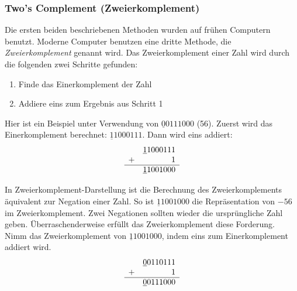 \subsubsection{Two's Complement (Zweierkomplement)
  }

Die ersten beiden beschriebenen Methoden wurden auf fr\"{u}hen Computern
benutzt. Moderne Computer benutzen eine dritte Methode, die
\emph{Zweierkomplement} genannt wird. Das Zweierkomplement einer
Zahl wird durch die folgenden zwei Schritte gefunden:
\begin{enumerate}
\parskip=-0.25em %

\item Finde das Einerkomplement der Zahl

\item Addiere eins zum Ergebnis aus Schritt 1
\end{enumerate}
Hier ist ein Beispiel unter Verwendung von $\underline{0}0111000$
(56). Zuerst wird das Einerkomplement berechnet:
$\underline{1}1000111$. Dann wird eins addiert:
\[
\begin{array}{rr}
  & \underline{1}1000111 \\
 +&                    1 \\
 \hline
  & \underline{1}1001000
\end{array}
\]

In Zweierkomplement-Darstellung ist die Berechnung des
Zweierkomplements \"{a}quivalent zur Negation einer Zahl. So ist
$\underline{1}1001000$ die Repr\"{a}sentation von $-56$ im
Zweierkomplement. Zwei Negationen sollten wieder die urspr\"{u}ngliche
Zahl geben. \"{U}berraschenderweise erf\"{u}llt das Zweierkomplement diese
Forderung. Nimm das Zweierkomplement von $\underline{1}1001000$,
indem eins zum Einerkomplement addiert wird.
\[
\begin{array}{rr}
  & \underline{0}0110111 \\
 +&                    1 \\
 \hline
  & \underline{0}0111000
\end{array}
\]

